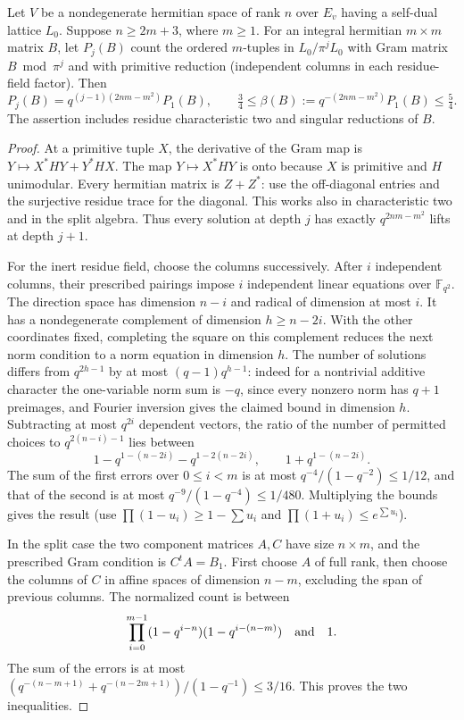 \begin{lemma}\label{lem:flag-primitive-density}
Let \(V\) be a nondegenerate hermitian space of rank \(n\) over
\(E_v\) having a self-dual lattice \(L_0\). Suppose \(n\ge2m+3\),
where \(m\ge1\). For an integral hermitian \(m\times m\) matrix
\(B\), let \(P_j(B)\) count the ordered \(m\)-tuples in
\(L_0/\pi^j L_0\) with Gram matrix \(B\bmod\pi^j\) and with
primitive reduction (independent columns in each residue-field
factor). Then
\[
 P_j(B)=q^{(j-1)(2nm-m^2)}P_1(B),\qquad
 \tfrac34\le \beta(B):=q^{-(2nm-m^2)}P_1(B)\le\tfrac54 .
\]
The assertion includes residue characteristic two and singular
reductions of \(B\).
\end{lemma}
\begin{proof}
At a primitive tuple \(X\), the derivative of the Gram map is
\(Y\mapsto X^*HY+Y^*HX\). The map \(Y\mapsto X^*HY\)
is onto because \(X\) is primitive and \(H\) unimodular.
Every hermitian matrix is \(Z+Z^*\): use the off-diagonal entries
and the surjective residue trace for the diagonal. This works also
in characteristic two and in the split algebra. Thus every solution
at depth \(j\) has exactly \(q^{2nm-m^2}\) lifts at depth \(j+1\).

For the inert residue field, choose the columns successively.
After \(i\) independent columns, their prescribed pairings impose
\(i\) independent linear equations over \(\mathbb F_{q^2}\).
The direction space has dimension \(n-i\) and radical of dimension
at most \(i\). It has a nondegenerate complement of dimension
\(h\ge n-2i\). With the other coordinates fixed, completing the
square on this complement reduces the next norm condition to a
norm equation in dimension \(h\). The number of solutions differs
from \(q^{2h-1}\) by at most \((q-1)q^{h-1}\): indeed for a
nontrivial additive character the one-variable norm sum is \(-q\),
since every nonzero norm has \(q+1\) preimages, and Fourier
inversion gives the claimed bound in dimension \(h\). Subtracting
at most \(q^{2i}\) dependent vectors, the ratio of the number of
permitted choices to \(q^{2(n-i)-1}\) lies between
\[
 1-q^{1-(n-2i)}-q^{1-2(n-2i)},\qquad
 1+q^{1-(n-2i)}.
\]
The sum of the first errors over \(0\le i<m\) is at most
\(q^{-4}/(1-q^{-2})\le1/12\), and that of the second is
at most \(q^{-9}/(1-q^{-4})\le1/480\).
Multiplying the bounds gives the result (use
\(\prod(1-u_i)\ge1-\sum u_i\) and \(\prod(1+u_i)\le e^{\sum u_i}\)).

In the split case the two component matrices \(A,C\) have size
\(n\times m\), and the prescribed Gram condition is \(C^tA=B_1\).
First choose \(A\) of full rank, then choose the columns of \(C\)
in affine spaces of dimension \(n-m\), excluding the span of
previous columns. The normalized count is between
\[
 \prod_{i=0}^{m-1}(1-q^{i-n})(1-q^{i-(n-m)})\quad\hbox{and}\quad1 .
\]
The sum of the errors is at most
\((q^{-(n-m+1)}+q^{-(n-2m+1)})/(1-q^{-1})\le3/16\).
This proves the two inequalities.
\end{proof}

